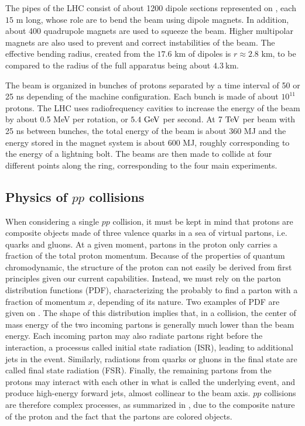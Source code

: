     The pipes of the LHC consist of about 1200 dipole sections represented on
    , each $15$ m long, whose role are to bend the beam using dipole
    magnets. In addition, about 400 quadrupole magnets are used to squeeze the
    beam. Higher multipolar magnets are also used to prevent and correct instabilities of
    the beam. The effective bending radius, created from the $17.6$ km of dipoles is
    $r \approx 2.8$ km, to be compared to the radius of the full apparatus being about $4.3~\text{km}$.

    The beam is organized in bunches of protons separated by a time interval of 50 or
    25 ns depending of the machine configuration. Each bunch is made of about $10^{11}$
    protons. The LHC uses radiofrequency cavities to increase the energy of the beam by
    about 0.5 MeV per rotation, or $5.4~\text{GeV}$ per second. At $7~\text{TeV}$ per beam with 25 ns
    between bunches, the total energy of the beam is about 360 MJ and the energy stored
    in the magnet system is about 600 MJ, roughly corresponding to the energy of a
    lightning bolt. The beams are then made to collide at four different points along the
    ring, corresponding to the four main experiments.

        \subsection{Physics of $pp$ collisions \label{sec:physicsFromCollisionsAtTheLHC}}

    When considering a single $pp$ collision, it must be kept in mind that protons are
    composite objects made of three valence quarks in a sea of virtual partons, i.e.
    quarks and gluons. At a given moment, partons in the proton only carries a fraction
    of the total proton momentum. Because of the properties of quantum chromodynamic, the
    structure of the proton can not easily be derived from first principles given our current
    capabilities. Instead, we must rely on the parton distribution functions (PDF),
    characterizing the probably to find a parton with a fraction of momentum $x$, depending
    of its nature. Two examples of PDF are given on
    . The shape of this
    distribution implies that, in a collision, the center of mass energy of the two incoming
    partons is generally much lower than the beam energy.  Each incoming parton may also
    radiate partons right before the interaction, a processus called initial state radiation
    (ISR), leading to additional jets in the event. Similarly, radiations from quarks or
    gluons in the final state are called final state radiation (FSR). Finally, the remaining
    partons from the protons may interact with each other in what is called the underlying
    event, and produce high-energy forward jets, almost collinear to the beam axis. $pp$
    collisions are therefore complex processes, as summarized in ,
    due to the composite nature of the proton and the fact that the partons are colored
    objects.

